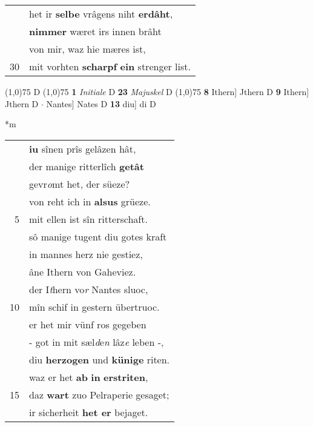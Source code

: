 \documentclass[8pt,a4paper,notitlepage]{article}
\begin{document}
\begin{table}[ht]
\begin{minipage}[t]{0.5\linewidth}
\begin{tabular}{rl}
 & het ir \textbf{selbe} vrâgens niht \textbf{erdâht},\\ 
 & \textbf{nimmer} wæret irs innen brâht\\ 
 & von mir, waz hie mæres ist,\\ 
30 & mit vorhten \textbf{scharpf} \textbf{ein} strenger list.\\ 
\end{tabular}
\scriptsize
\line(1,0){75} \newline
D \newline
\line(1,0){75} \newline
\textbf{1} \textit{Initiale} D  \textbf{23} \textit{Majuskel} D  \newline
\line(1,0){75} \newline
\textbf{8} Ithern] Jthern D \textbf{9} Ithern] Jthern D  $\cdot$ Nantes] Nates D \textbf{13} diu] di D \newline
\end{minipage}
\hspace{0.5cm}
\begin{minipage}[t]{0.5\linewidth}
\small
\begin{center}*m
\end{center}
\begin{tabular}{rl}
 & \textbf{iu} sînen prîs gelâzen hât,\\ 
 & der manige ritterlîch \textbf{getât}\\ 
 & gevr\textit{o}mt het, der süeze?\\ 
 & von reht ich in \textbf{alsus} grüeze.\\ 
5 & mit ellen ist sîn ritterschaft.\\ 
 & sô manige tugent diu gotes kraft\\ 
 & in mannes herz nie gestiez,\\ 
 & âne Ithern von Gaheviez.\\ 
 & der I\textit{t}hern vo\textit{r} Nantes sluoc,\\ 
10 & mîn schif in gestern übertruoc.\\ 
 & er het mir vünf ros gegeben\\ 
 & - got in mit sæl\textit{d}e\textit{n} lâz\textit{e} leben -,\\ 
 & diu \textbf{herzogen} und \textbf{künige} riten.\\ 
 & waz er het \textbf{ab} \textbf{in} \textbf{erstriten},\\ 
15 & daz \textbf{wart} zuo Pelraperie gesaget;\\ 
 & ir sicherheit \textbf{het er} bejaget.\\ 

\end{tabular}
\end{minipage}
\end{table}
\end{document}
